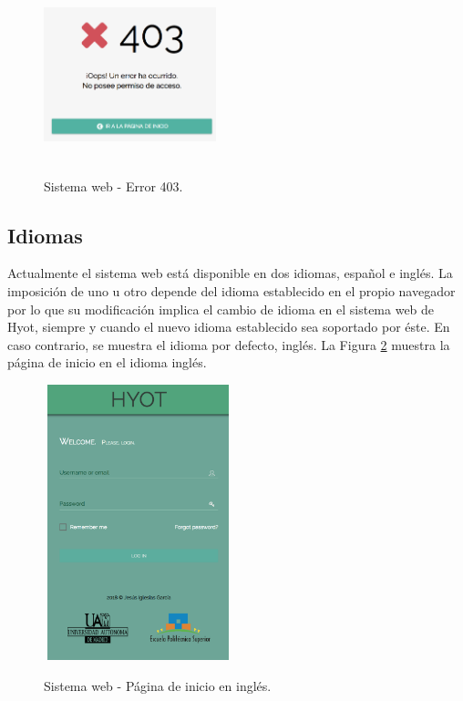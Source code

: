\documentclass[12pt,a4paper, twoside]{report}
\begin{document}
	
		\begin{figure}[!ht]   
			\caption{Sistema web - Error 403.} 
			\begin{center} 
	 			\includegraphics[width=5cm, height=5cm]{Images/userGuide/web/error403} \\
				\label{fig:web_error403} 
			\end{center}  	
		\end{figure}

	\subsection{Idiomas}
	
	Actualmente el sistema web está disponible en dos idiomas, español e inglés. La imposición de uno u otro depende del idioma establecido en el propio navegador por lo que su modificación implica el cambio de idioma en el sistema web de Hyot, siempre y cuando el nuevo idioma establecido sea soportado por éste. En caso contrario, se muestra el idioma por defecto, inglés. La Figura \ref{fig:web_english} muestra la página de inicio en el idioma inglés.

		\begin{figure}[!ht]   
			\caption{Sistema web - Página de inicio en inglés.} 
			\begin{center} 
	 			\includegraphics[width=5.5cm, height=8cm]{Images/userGuide/web/english} \\
				\label{fig:web_english} 
			\end{center}  	
		\end{figure}
	
\end{document}
